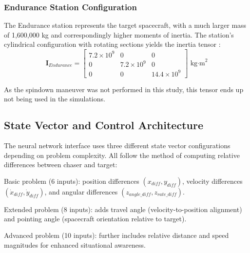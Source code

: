 \subsubsection{Endurance Station Configuration}

The Endurance station represents the target spacecraft, with a much larger mass
of 1,600,000 kg and correspondingly higher moments of inertia. The station's
cylindrical configuration with rotating sections yields the inertia tensor
\parencite{Girija2016}:
\begin{equation}
    \mathbf{I}_{Endurance} = \begin{bmatrix}
        7.2 \times 10^9 & 0               & 0                \\
        0               & 7.2 \times 10^9 & 0                \\
        0               & 0               & 14.4 \times 10^9
    \end{bmatrix} \text{ kg·m}^2
\end{equation}

As the spindown maneuver was not performed in this study, this tensor ends up
not being used in the simulations.


\subsection{State Vector and Control Architecture}

The neural network interface uses three different state vector configurations depending on problem complexity. All follow the \cite{leitner2010evolving} method of computing relative differences between chaser and target:

Basic problem (6 inputs): position differences $(x_{diff}, y_{diff})$, velocity differences $(\dot{x}_{diff}, \dot{y}_{diff})$, and angular differences $(z_{angle\_diff}, z_{rate\_diff})$.

Extended problem (8 inputs): adds travel angle (velocity-to-position alignment) and pointing angle (spacecraft orientation relative to target).

Advanced problem (10 inputs): further includes relative distance and speed magnitudes for enhanced situational awareness.

